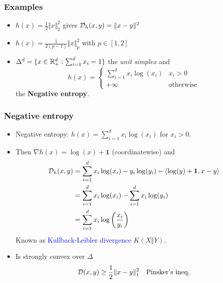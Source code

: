 \documentclass{beamer}
\begin{document}
\begin{frame}
  \frametitle{Examples} %
  \begin{itemize}
    \item $h(x) = \frac12 \Vert x \Vert_2^2$ gives $\mathcal{D}_h(x,y) = \Vert x-y \Vert^2$
    \item $h(x) = \frac{1}{2(p-1)} \Vert x \Vert_p^2$ with $p \in [1, 2]$
    \item  $\Delta^d= \{x \in \mathbb{R}^d_+ : \sum_{i=1}^{d}x_i = 1\}$ the \emph{unit simplex} and
          \begin{equation}
            h(x) =
            \begin{cases}
              \sum_{i=1}^{d} x_i \log(x_i) & x_i > 0 \\
              +\infty & \text{otherwise}
            \end{cases}
          \end{equation}
          the \textbf{Negative entropy}.\\
  \end{itemize}
\end{frame}


\begin{frame}
  \frametitle{Negative entropy}
  \begin{itemize}
    \item Negative entropy: $h(x) = \sum_{i=1}^{d} x_i \log(x_i)$ for $ x_i > 0$. \\
    \item Then $ \nabla h(x) = \log(x) + \bm{1}$ (coordinatewise) and
    \begin{equation}
    \begin{aligned}
        \mathcal{D}_h(x,y) &= \sum_{i=1}^{d}x_i \log(x_i) - y_i \log(y_i) - \langle \log(y)+ \bm{1}, x-y \rangle \\
        &= \sum_{i=1}^{d} x_i \log(x_i) - \sum_{i=1}^{d} x_i \log(y_i) \\
        &= \sum_{i=1}^{d} x_i \log\left(\frac{x_i}{y_i}\right)
    \end{aligned}
    \end{equation}
    Known as \textcolor{blue}{Kullback-Leibler divergence} $K(X \Vert Y)$.
    \item Is strongly convex over $\Delta$
    \begin{equation}
      \mathcal{D}(x, y) \ge \frac12 \Vert x-y \Vert_1^2 \quad \text{Pinsker's ineq.}
    \end{equation}
  \end{itemize}
\end{frame}
\end{document}

